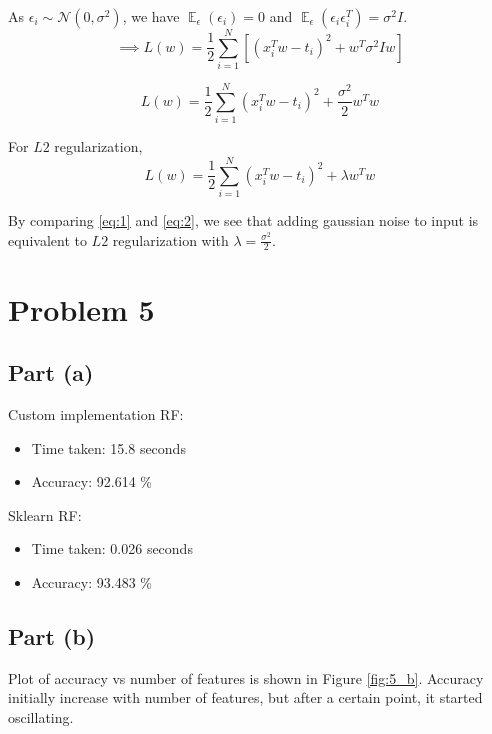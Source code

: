 \documentclass[12pt]{article}
\DeclareMathOperator{\E}{\mathbb{E}}
\begin{document}
As $\epsilon_i \sim \mathcal{N}(0, \sigma^2)$, we have $\E_{\epsilon} (\epsilon_i) = 0$ and $\E_{\epsilon} (\epsilon_i \epsilon_i^T) = \sigma^2 I$.
\begin{equation*}
    \implies
    L(w) = \frac{1}{2} \sum_{i=1}^{N} [(x_i^T w - t_i)^2 + w^T \sigma^2 I w]
\end{equation*}

\begin{equation}
    L(w) = \frac{1}{2} \sum_{i=1}^{N} (x_i^T w - t_i)^2 + \frac{\sigma^2}{2} w^T w
    \tag{1}\label{eq:1}
\end{equation}

For $L2$ regularization, 
\begin{equation}
    L(w) = \frac{1}{2} \sum_{i=1}^{N} (x_i^T w - t_i)^2 + \lambda w^T w
    \tag{2}\label{eq:2}
\end{equation}

By comparing \eqref{eq:1} and \eqref{eq:2}, we see that adding gaussian noise to input is equivalent to $L2$ regularization with $\lambda = \frac{\sigma^2}{2}$.

\section*{Problem 5}
\subsection*{Part (a)}
Custom implementation RF:
\begin{itemize}
    \item Time taken: 15.8 seconds
    \item Accuracy: 92.614 \% 
\end{itemize}
Sklearn RF:
\begin{itemize}
    \item Time taken: 0.026 seconds
    \item Accuracy: 93.483 \%
\end{itemize}

\subsection*{Part (b)}
Plot of accuracy vs number of features is shown in Figure \ref{fig:5_b}.
Accuracy initially increase with number of features, but after a certain point, it started oscillating.
\end{document}

